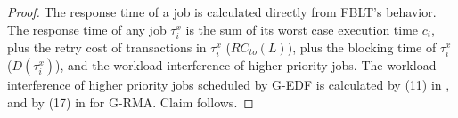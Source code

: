 \documentclass[a4paper,english]{article}
\newtheorem{clm}{Claim}
\newtheorem{proof}{Proof}
\begin{document}
\begin{proof}\normalfont
The response time of a job is calculated directly from FBLT's behavior. The response time of any job $\tau_{i}^{x}$ is the sum of its
worst case execution time $c_{i}$, plus the retry cost of transactions
in $\tau_{i}^{x}$ ($RC_{to}(L)$), plus the blocking time of $\tau_{i}^{x}$
($D(\tau_{i}^{x})$), and the workload interference of higher priority
jobs. The workload interference of higher priority jobs scheduled by
G-EDF is calculated by (11) in \cite{stmconcurrencycontrol:emsoft11},
and by (17) in \cite{stmconcurrencycontrol:emsoft11} for G-RMA. Claim follows.
\end{proof}

\end{document}
